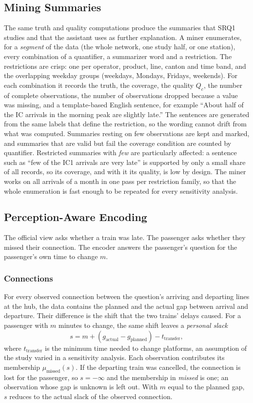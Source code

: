 \subsection{Mining Summaries}
\label{sec:mining}
The same truth and quality computations produce the summaries that SRQ1 studies and that
the assistant uses as further explanation. A miner enumerates, for a \emph{segment} of the
data (the whole network, one study half, or one station), every combination of a quantifier,
a summarizer word and a restriction. The restrictions are crisp: one per operator, product,
line, canton and time band, and the overlapping weekday groups (weekdays, Mondays, Fridays,
weekends). For each combination it records the truth, the coverage, the quality $Q_c$, the
number of complete observations, the number of observations dropped because a value was
missing, and a template-based English sentence, for example ``About half of the IC arrivals
in the morning peak are slightly late.'' The sentences are generated from the same
labels that define the restriction, so the wording cannot drift from what was computed.
Summaries resting on few observations are kept and marked, and summaries that are valid but
fail the coverage condition are counted by quantifier. Restricted summaries with \emph{few}
are particularly affected: a sentence such as ``few of the IC1 arrivals are very late'' is
supported by only a small share of all records, so its coverage, and with it its quality,
is low by design. The miner works on all arrivals of a month in one pass per restriction
family, so that the whole enumeration is fast enough to be repeated for every sensitivity
analysis.

\subsection{Perception-Aware Encoding}
\label{sec:encoder}
The official view asks whether a train was late. The passenger asks whether they missed
their connection. The encoder answers the passenger's question for the passenger's own time
to change $m$.

\subsubsection*{Connections} For every observed connection between the question's arriving and
departing lines at the hub, the data contains the planned and the actual gap between arrival
and departure. Their difference is the shift that the two trains' delays caused. For a
passenger with $m$ minutes to change, the same shift leaves a \emph{personal slack}
\begin{equation}
  s = m + (g_{\text{actual}} - g_{\text{planned}}) - t_{\text{transfer}},
\end{equation}
where $t_{\text{transfer}}$ is the minimum time needed to change platforms, an assumption of
the study varied in a sensitivity analysis. Each observation contributes its membership
$\mu_{\text{missed}}(s)$. If the departing train was cancelled, the connection is lost for
the passenger, so $s = -\infty$ and the membership in \emph{missed} is one; an observation
whose gap is unknown is left out. With $m$ equal to the planned gap, $s$ reduces to the
actual slack of the observed connection.

